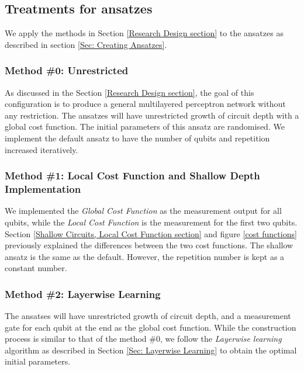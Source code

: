 \subsection{Treatments for ansatzes} \label{Sec: Treatments for ansatzes}
We apply the methods in Section \ref{Research Design section} to the ansatzes as described in section \ref{Sec: Creating Ansatzes}.

\subsubsection{Method \#0: Unrestricted} \label{Sec: Method0}
As discussed in the Section \ref{Research Design section}, the goal of this configuration is to produce a general multilayered perceptron network without any restriction.
The ansatzes will have unrestricted growth of circuit depth with a global cost function.
The initial parameters of this ansatz are randomised.
We implement the default ansatz to have the number of qubits and repetition increased iteratively.

\subsubsection{Method \#1: Local Cost Function and Shallow Depth Implementation} \label{Sec: Method1}
We implemented the \textit{Global Cost Function} as the measurement output for all qubits, while the \textit{Local Cost Function} is the measurement for the first two qubits.
Section \ref{Shallow Circuits, Local Cost Function section} and figure \ref{cost functions} previously explained the differences between the two cost functions.
The shallow ansatz is the same as the default.
However, the repetition number is kept as a constant number.

\subsubsection{Method \#2: Layerwise Learning} \label{Sec: Method2}
The ansatses will have unrestricted growth of circuit depth, and a measurement gate for each qubit at the end as the global cost function.
While the construction process is similar to that of the method \#0, we follow the \emph{Layerwise learning} algorithm as described in Section \ref{Sec: Layerwise Learning} to obtain the optimal initial parameters.

